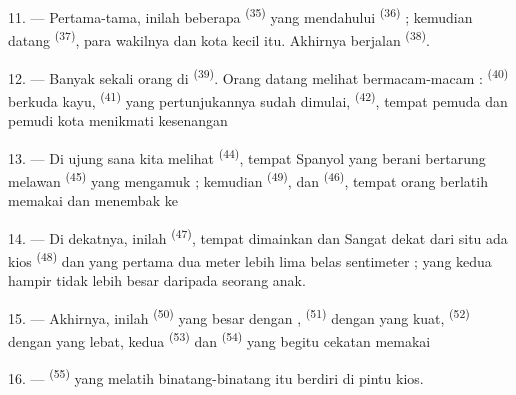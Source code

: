11. --- Pertama-tama, inilah beberapa 
\textsuperscript{(35)} yang mendahului 
\textsuperscript{(36)} ; kemudian datang 
\textsuperscript{(37)}, para wakilnya dan  kota
kecil itu. Akhirnya berjalan 
\textsuperscript{(38)}.

\VUsaut{5.0mm}
\VUsaut{3.6mm}

12. --- Banyak sekali orang di 
\textsuperscript{(39)}. Orang datang melihat bermacam-macam
 :  \textsuperscript{(40)} berkuda
kayu,  \textsuperscript{(41)} yang pertunjukannya sudah
dimulai,  \textsuperscript{(42)}, tempat
pemuda dan pemudi kota menikmati kesenangan 

13. --- Di ujung sana kita melihat 
\textsuperscript{(44)}, tempat  Spanyol yang berani
bertarung melawan  \textsuperscript{(45)} yang
mengamuk ; kemudian  \textsuperscript{(49)}, dan
 \textsuperscript{(46)}, tempat orang berlatih
memakai  dan menembak ke 

14. --- Di dekatnya, inilah 
\textsuperscript{(47)}, tempat dimainkan  dan
 Sangat dekat dari situ ada kios 
\textsuperscript{(48)} dan   yang
pertama dua meter lebih lima belas sentimeter ; yang kedua hampir
tidak lebih besar daripada seorang anak.

15. --- Akhirnya, inilah 
\textsuperscript{(50)} yang besar dengan ,  \textsuperscript{(51)} dengan
 yang kuat,  \textsuperscript{(52)}
dengan  yang lebat, kedua 
\textsuperscript{(53)} dan  \textsuperscript{(54)}
yang begitu cekatan memakai 

16. ---  \textsuperscript{(55)} yang melatih
binatang-binatang itu berdiri di pintu kios.

\VUsaut{6.0mm}
\VUfilet{22mm}
